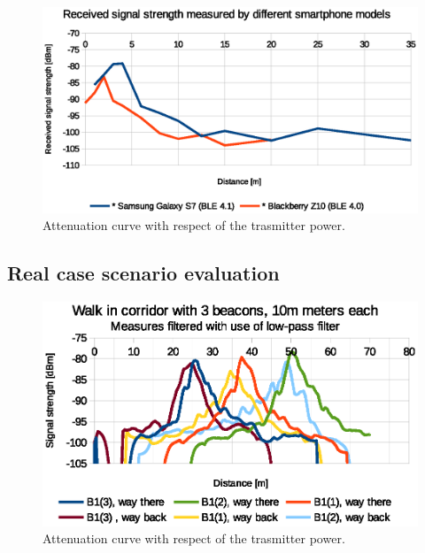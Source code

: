 \documentclass[../main.tex]{subfiles}
\begin{document}
\begin{figure}[ht]
\includegraphics[width=\textwidth, keepaspectratio]{pictures/tests_case9_smartphone_comparison}
\centering
\caption{Attenuation curve with respect of the trasmitter power.}
\label{fig:tests_case9_smartphone_comparison}
\end{figure}

\FloatBarrier
\subsection{Real case scenario evaluation} %
\label{sub:real_case_scenario_evaluation}


\begin{figure}[ht]
\includegraphics[width=\textwidth, keepaspectratio]{pictures/tests_case10_walk_10m_low_pass}
\centering
\caption{Attenuation curve with respect of the trasmitter power.}
\label{fig:tests_case10_walk_10m_low_pass}
\end{figure}
\end{document}
